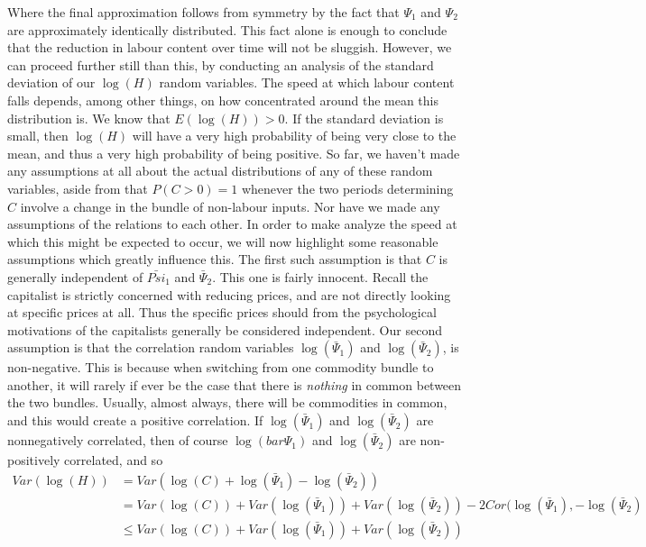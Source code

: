 \documentclass{article}
\theoremstyle{definition}
\theoremstyle{plain}
\theoremstyle{theorem}
\begin{document}
Where the final approximation follows from symmetry by the fact that $\Psi_1$ and $\Psi_2$ are approximately identically distributed. This fact alone is enough to conclude that the reduction in labour content over time will not be sluggish. However, we can proceed further still than this, by conducting an analysis of the standard deviation of our $\log(H)$ random variables. The speed at which labour content falls depends, among other things, on how concentrated around the mean this distribution is. We know that $E(\log(H))>0$. If the standard deviation is small, then $\log(H)$ will have a very high probability of being very close to the mean, and thus a very high probability of being positive. So far, we haven't made any assumptions at all about the actual distributions of any of these random variables, aside from that $P(C > 0) = 1$ whenever the two periods determining $C$ involve a change in the bundle of non-labour inputs. Nor have we made any assumptions of the relations to each other. In order to make analyze the speed at which this might be expected to occur, we will now highlight some reasonable assumptions which greatly influence this. The first such assumption is that $C$ is generally independent of $\bar{Psi}_1$ and $\bar{\Psi}_2$. This one is fairly innocent. Recall the capitalist is strictly concerned with reducing prices, and are not directly looking at specific prices at all. Thus the specific prices should from the psychological motivations of the capitalists generally be considered independent. Our second assumption is that the correlation random variables $\log(\bar{\Psi}_1)$ and $\log(\bar{\Psi}_2)$, is non-negative. This is because when switching from one commodity bundle to another, it will rarely if ever be the case that there is \textit{nothing} in common between the two bundles. Usually, almost always, there will be commodities in common, and this would create a positive correlation. If $\log(\bar{\Psi}_1)$ and $\log(\bar{\Psi}_2)$ are nonnegatively correlated, then of course $\log(bar{\Psi}_1)$ and $\log(\bar{\Psi}_2)$ are non-positively correlated, and so  
\begin{align}
	Var(\log(H)) &= Var(\log(C)+\log(\bar{\Psi}_1)-\log(\bar{\Psi}_2)) \\
			&= Var(\log(C))+Var(\log(\bar{\Psi}_1)) + Var(\log(\bar{\Psi}_2)) - 2Cor(\log(\bar{\Psi}_1),-\log(\bar{\Psi}_2)\\
			&\leq Var(\log(C))+Var(\log(\bar{\Psi}_1)) + Var(\log(\bar{\Psi}_2))
\end{align}
\end{document}
